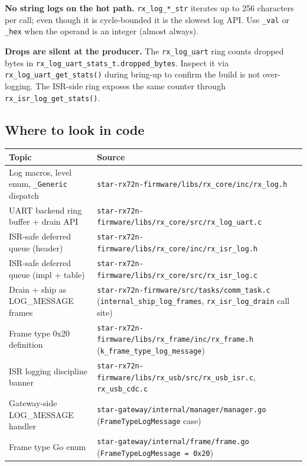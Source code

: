 \textbf{No string logs on the hot path.} \texttt{rx\_log\_*\_str}
iterates up to 256 characters per call; even though it is cycle-bounded
it is the slowest log API. Use \texttt{\_val} or \texttt{\_hex}
when the operand is an integer (almost always).

\textbf{Drops are silent at the producer.} The
\texttt{rx\_log\_uart} ring counts dropped bytes in
\texttt{rx\_log\_uart\_stats\_t.dropped\_bytes}. Inspect it via
\texttt{rx\_log\_uart\_get\_stats()} during bring-up to confirm the
build is not over-logging. The ISR-side ring exposes the same counter
through \texttt{rx\_isr\_log\_get\_stats()}.

\subsection{Where to look in code}

\begin{center}
\begin{tabular}{|p{5.5cm}|p{9.0cm}|}
\hline
\textbf{Topic}                          & \textbf{Source}                                                                                                                    \\
\hline
Log macros, level enum, \texttt{\_Generic} dispatch & \texttt{star-rx72n-firmware/libs/rx\_core/inc/rx\_log.h}                                                                \\
UART backend ring buffer + drain API    & \texttt{star-rx72n-firmware/libs/rx\_core/src/rx\_log\_uart.c}                                                                     \\
ISR-safe deferred queue (header)        & \texttt{star-rx72n-firmware/libs/rx\_core/inc/rx\_isr\_log.h}                                                                     \\
ISR-safe deferred queue (impl + table)  & \texttt{star-rx72n-firmware/libs/rx\_core/src/rx\_isr\_log.c}                                                                     \\
Drain + ship as LOG\_MESSAGE frames     & \texttt{star-rx72n-firmware/src/tasks/comm\_task.c} (\texttt{internal\_ship\_log\_frames}, \texttt{rx\_isr\_log\_drain} call site) \\
Frame type 0x20 definition              & \texttt{star-rx72n-firmware/libs/rx\_frame/inc/rx\_frame.h} (\texttt{k\_frame\_type\_log\_message})                                \\
ISR logging discipline banner           & \texttt{star-rx72n-firmware/libs/rx\_usb/src/rx\_usb\_isr.c}, \texttt{rx\_usb\_cdc.c}                                              \\
Gateway-side LOG\_MESSAGE handler       & \texttt{star-gateway/internal/manager/manager.go} (\texttt{FrameTypeLogMessage} case)                                              \\
Frame type Go enum                      & \texttt{star-gateway/internal/frame/frame.go} (\texttt{FrameTypeLogMessage = 0x20})                                                \\
\hline
\end{tabular}
\end{center}
